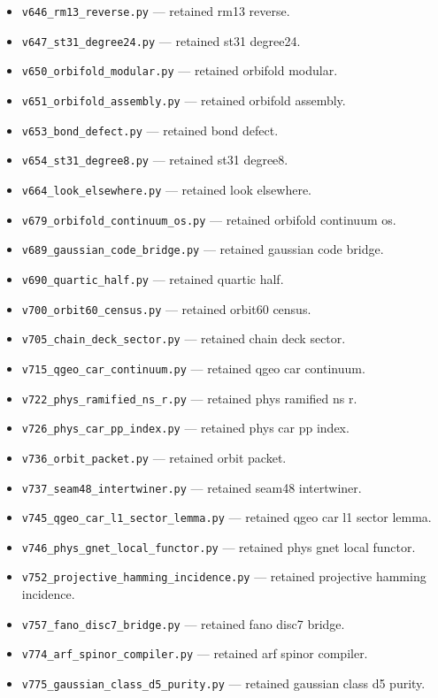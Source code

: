 \begin{itemize}[leftmargin=2em,itemsep=1pt]
\item \texttt{v646\_rm13\_reverse.py} --- retained rm13 reverse.
\item \texttt{v647\_st31\_degree24.py} --- retained st31 degree24.
\item \texttt{v650\_orbifold\_modular.py} --- retained orbifold modular.
\item \texttt{v651\_orbifold\_assembly.py} --- retained orbifold assembly.
\item \texttt{v653\_bond\_defect.py} --- retained bond defect.
\item \texttt{v654\_st31\_degree8.py} --- retained st31 degree8.
\item \texttt{v664\_look\_elsewhere.py} --- retained look elsewhere.
\item \texttt{v679\_orbifold\_continuum\_os.py} --- retained orbifold continuum os.
\item \texttt{v689\_gaussian\_code\_bridge.py} --- retained gaussian code bridge.
\item \texttt{v690\_quartic\_half.py} --- retained quartic half.
\item \texttt{v700\_orbit60\_census.py} --- retained orbit60 census.
\item \texttt{v705\_chain\_deck\_sector.py} --- retained chain deck sector.
\item \texttt{v715\_qgeo\_car\_continuum.py} --- retained qgeo car continuum.
\item \texttt{v722\_phys\_ramified\_ns\_r.py} --- retained phys ramified ns r.
\item \texttt{v726\_phys\_car\_pp\_index.py} --- retained phys car pp index.
\item \texttt{v736\_orbit\_packet.py} --- retained orbit packet.
\item \texttt{v737\_seam48\_intertwiner.py} --- retained seam48 intertwiner.
\item \texttt{v745\_qgeo\_car\_l1\_sector\_lemma.py} --- retained qgeo car l1 sector lemma.
\item \texttt{v746\_phys\_gnet\_local\_functor.py} --- retained phys gnet local functor.
\item \texttt{v752\_projective\_hamming\_incidence.py} --- retained projective hamming incidence.
\item \texttt{v757\_fano\_disc7\_bridge.py} --- retained fano disc7 bridge.
\item \texttt{v774\_arf\_spinor\_compiler.py} --- retained arf spinor compiler.
\item \texttt{v775\_gaussian\_class\_d5\_purity.py} --- retained gaussian class d5 purity.

\end{itemize}
